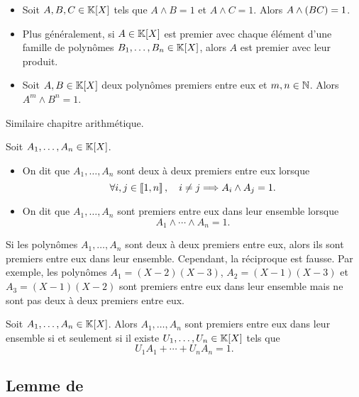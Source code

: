 \documentclass{magnolia}
\begin{document}
\begin{proposition}
$\quad$
\begin{itemize}
\item Soit $A,B,C\in\polyK$ tels que $A\wedge B=1$ et $A\wedge C=1$. Alors
  $A\wedge \left(BC\right)=1$.
\item Plus généralement, si $A\in\polyK$ est premier avec chaque élément d'une
  famille de polynômes $B_1,\ldots,B_n\in\polyK$, alors $A$ est premier avec leur
  produit.
\item Soit $A,B\in\polyK$ deux polynômes premiers entre eux et $m,n\in\mathbb{N}$. Alors
  $A^m\wedge B^n=1$.
\end{itemize}
\end{proposition}

\begin{preuve}
Similaire chapitre arithmétique.
\end{preuve}


\begin{definition}
Soit $A_1,\ldots,A_n\in\polyK$.
\begin{itemize}
\item On dit que $A_1,\ldots,A_n$ sont deux à deux premiers entre eux lorsque
  \[\forall i,j\in\left\llbracket 1,n\right\rrbracket ,\quad i\neq j \Longrightarrow A_i\wedge A_j=1.\]
\item On dit que $A_1,\ldots,A_n$ sont premiers entre eux dans leur ensemble lorsque
  \[A_1\wedge\cdots\wedge A_n=1.\]
\end{itemize}
\end{definition}

\begin{remarqueUnique}
\remarque Si les polynômes $A_1,\ldots,A_n$ sont deux à deux premiers entre eux, alors
  ils sont premiers entre eux dans leur ensemble. Cependant, la réciproque est fausse.
  Par exemple, les polynômes $A_1=(X-2)(X-3)$, $A_2=(X-1)(X-3)$ et $A_3=(X-1)(X-2)$
  sont premiers entre eux dans leur ensemble mais ne sont pas deux à deux premiers
  entre eux.
\end{remarqueUnique}


\begin{proposition}
Soit $A_1,\ldots,A_n\in\polyK$. Alors $A_1,\ldots,A_n$ sont premiers entre eux dans leur
ensemble si et seulement si il existe $U_1,\ldots,U_n\in\polyK$ tels que
\[U_1 A_1+\cdots+U_n A_n=1.\]
\end{proposition}


\subsection{Lemme de }
\end{document}
